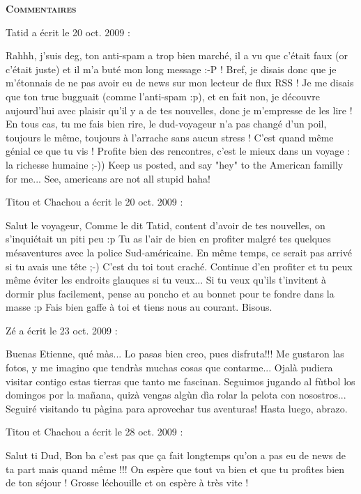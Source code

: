 \bigskip
\textbf{\textsc{Commentaires}}

\medskip
Tatid a écrit le 20 oct. 2009 :
\begin{displayquote}
Rahhh, j'suis deg, ton anti-spam a trop bien marché, il a vu que c'était faux (or c'était juste) et il m'a buté mon long message :-P !
Bref, je disais donc que je m'étonnais de ne pas avoir eu de news sur mon lecteur de flux RSS ! Je me disais que ton truc bugguait (comme l'anti-spam :p), et en fait non, je découvre aujourd'hui avec plaisir qu'il y a de tes nouvelles, donc je m'empresse de les lire !
En tous cas, tu me fais bien rire, le dud-voyageur n'a pas changé d'un poil, toujours le même, toujours à l'arrache sans aucun stress ! C'est quand même génial ce que tu vis ! Profite bien des rencontres, c'est le mieux dans un voyage : la richesse humaine ;-))
Keep us posted, and say "hey" to the American familly for me... See, americans are not all stupid haha!
\end{displayquote}

\medskip
Titou et Chachou a écrit le 20 oct. 2009 :
\begin{displayquote}
Salut le voyageur,
Comme le dit Tatid, content d'avoir de tes nouvelles, on s'inquiétait un piti peu :p
Tu as l'air de bien en profiter malgré tes quelques mésaventures avec la police Sud-américaine. En même temps, ce serait pas arrivé si tu avais une tête ;-) C'est du toi tout craché.
Continue d'en profiter et tu peux même éviter les endroits glauques si tu veux... Si tu veux qu'ils t'invitent à dormir plus facilement, pense au poncho et au bonnet pour te fondre dans la masse :p
Fais bien gaffe à toi et tiens nous au courant.
Bisous.
\end{displayquote}

\medskip
Zé a écrit le 23 oct. 2009 :
\begin{displayquote}
Buenas Etienne, qué màs...
Lo pasas bien creo, pues disfruta!!!
Me gustaron las fotos, y me imagino que tendràs muchas cosas que contarme...
Ojalà pudiera visitar contigo estas tierras que tanto me fascinan.
Seguimos jugando al fùtbol los domingos por la mañana, quizà vengas algùn dìa rolar la pelota con nosostros...
Seguiré visitando tu pàgina para aprovechar tus aventuras!
Hasta luego, abrazo.
\end{displayquote}

\medskip
Titou et Chachou a écrit le 28 oct. 2009 :
\begin{displayquote}
Salut ti Dud,
Bon ba c'est pas que ça fait longtemps qu'on a pas eu de news de ta part mais quand même !!! On espère que tout va bien et que tu profites bien de ton séjour !
Grosse léchouille et on espère à très vite !
\end{displayquote}


